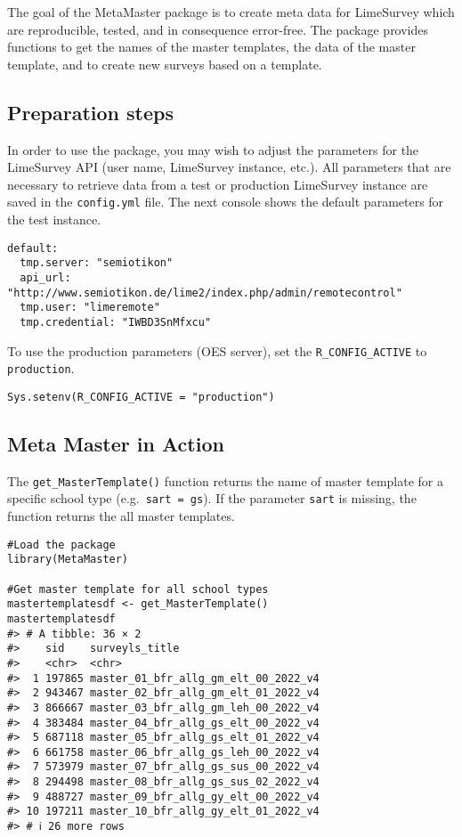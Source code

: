 The goal of the MetaMaster package is to create meta data for LimeSurvey
which are reproducible, tested, and in consequence error-free. The
package provides functions to get the names of the master templates, the
data of the master template, and to create new surveys based on a
template.

\subsection{Preparation steps}\label{preparation-steps}

In order to use the package, you may wish to adjust the parameters for
the LimeSurvey API (user name, LimeSurvey instance, etc.). All
parameters that are necessary to retrieve data from a test or production
LimeSurvey instance are saved in the \texttt{config.yml} file. The next
console shows the default parameters for the test instance.

\begin{verbatim}
default:
  tmp.server: "semiotikon"
  api_url: "http://www.semiotikon.de/lime2/index.php/admin/remotecontrol"
  tmp.user: "limeremote"
  tmp.credential: "IWBD3SnMfxcu"
\end{verbatim}

To use the production parameters (OES server), set the
\texttt{R\_CONFIG\_ACTIVE} to \texttt{production}.

\begin{verbatim}
Sys.setenv(R_CONFIG_ACTIVE = "production")
\end{verbatim}

\subsection{Meta Master in Action}\label{meta-master-in-action}

The \texttt{get\_MasterTemplate()} function returns the name of master
template for a specific school type
(e.g.~\texttt{sart\ =\ \textquotesingle{}gs\textquotesingle{}}). If the
parameter \texttt{sart} is missing, the function returns the all master
templates.

\begin{verbatim}
#Load the package
library(MetaMaster)

#Get master template for all school types
mastertemplatesdf <- get_MasterTemplate()
mastertemplatesdf
#> # A tibble: 36 × 2
#>    sid    surveyls_title                      
#>    <chr>  <chr>                               
#>  1 197865 master_01_bfr_allg_gm_elt_00_2022_v4
#>  2 943467 master_02_bfr_allg_gm_elt_01_2022_v4
#>  3 866667 master_03_bfr_allg_gm_leh_00_2022_v4
#>  4 383484 master_04_bfr_allg_gs_elt_00_2022_v4
#>  5 687118 master_05_bfr_allg_gs_elt_01_2022_v4
#>  6 661758 master_06_bfr_allg_gs_leh_00_2022_v4
#>  7 573979 master_07_bfr_allg_gs_sus_00_2022_v4
#>  8 294498 master_08_bfr_allg_gs_sus_02_2022_v4
#>  9 488727 master_09_bfr_allg_gy_elt_00_2022_v4
#> 10 197211 master_10_bfr_allg_gy_elt_01_2022_v4
#> # ℹ 26 more rows
\end{verbatim}

